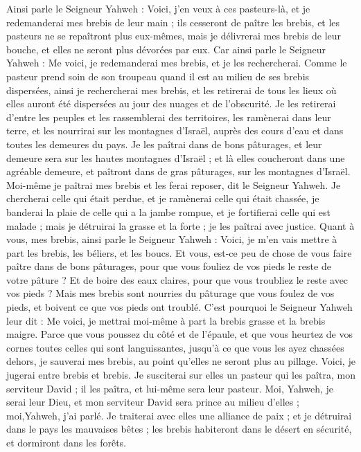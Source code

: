\begin{multicols}{2}
Ainsi parle le Seigneur Yahweh : Voici, j'en veux à ces pasteurs-là, et je redemanderai mes brebis de leur main ; ils cesseront de paître les brebis, et les pasteurs ne se repaîtront plus eux-mêmes, mais je délivrerai mes brebis de leur bouche, et elles ne seront plus dévorées par eux.
Car ainsi parle le Seigneur Yahweh : Me voici, je redemanderai mes brebis, et je les rechercherai.
Comme le pasteur prend soin de son troupeau quand il est au milieu de ses brebis dispersées, ainsi je rechercherai mes brebis, et les retirerai de tous les lieux où elles auront été dispersées au jour des nuages et de l'obscurité.
Je les retirerai d'entre les peuples et les rassemblerai des territoires, les ramènerai dans leur terre, et les nourrirai sur les montagnes d'Israël, auprès des cours d’eau et dans toutes les demeures du pays.
Je les paîtrai dans de bons pâturages, et leur demeure sera sur les hautes montagnes d'Israël ; et là elles coucheront dans une agréable demeure, et paîtront dans de gras pâturages, sur les montagnes d'Israël.
Moi-même je paîtrai mes brebis et les ferai reposer, dit le Seigneur Yahweh\FTNT{}.
Je chercherai celle qui était perdue, et je ramènerai celle qui était chassée, je banderai la plaie de celle qui a la jambe rompue, et je fortifierai celle qui est malade ; mais je détruirai la grasse et la forte ; je les paîtrai avec justice.
Quant à vous, mes brebis, ainsi parle le Seigneur Yahweh : Voici, je m'en vais mettre à part les brebis, les béliers, et les boucs.
Et vous, est-ce peu de chose de  vous faire paître dans de bons pâturages, pour que vous fouliez de vos pieds le reste de votre pâture ? Et de boire des eaux claires, pour que vous troubliez le reste avec vos pieds ?
Mais mes brebis sont nourries du pâturage que vous foulez de vos pieds, et boivent ce que vos pieds ont troublé.
C'est pourquoi le Seigneur Yahweh leur dit : Me voici, je mettrai moi-même à part la brebis grasse et la brebis maigre.
Parce que vous poussez du côté et de l'épaule, et que vous heurtez de vos cornes toutes celles qui sont languissantes, jusqu'à ce que vous les ayez chassées dehors,
je sauverai mes brebis, au point qu'elles ne seront plus au pillage. Voici, je jugerai entre brebis et brebis.
Je susciterai sur elles un pasteur qui les paîtra, mon serviteur David ; il les paîtra, et lui-même sera leur pasteur.
Moi, Yahweh, je serai leur Dieu, et mon serviteur David sera prince au milieu d'elles ; moi,Yahweh, j'ai parlé.
Je traiterai avec elles une alliance de paix ; et je détruirai dans le pays les mauvaises bêtes ; les brebis habiteront dans le désert en sécurité, et dormiront dans les forêts.

\end{multicols}
